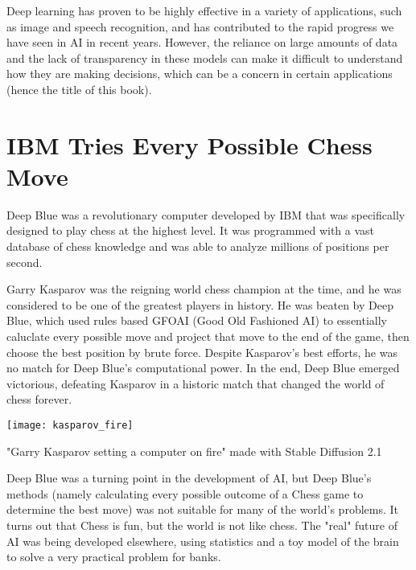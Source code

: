 Deep learning has proven to be highly effective in a variety of applications, such as image and speech recognition, and has contributed to the rapid progress we have seen in AI in recent years. However, the reliance on large amounts of data and the lack of transparency in these models can make it difficult to understand how they are making decisions, which can be a concern in certain applications (hence the title of this book).

\section{IBM Tries Every Possible Chess Move}

Deep Blue was a revolutionary computer developed by IBM that was specifically designed to play chess at the highest level. It was programmed with a vast database of chess knowledge and was able to analyze millions of positions per second.

Garry Kasparov was the reigning world chess champion at the time, and he was considered to be one of the greatest players in history. He was beaten by Deep Blue, which used rules based GFOAI (Good Old Fashioned AI) to essentially caluclate every possible move and project that move to the end of the game, then choose the best position by brute force. Despite Kasparov's best efforts, he was no match for Deep Blue's computational power. In the end, Deep Blue emerged victorious, defeating Kasparov in a historic match that changed the world of chess forever.

\begin{marginfigure}[-5.5cm]
        \texttt{[image: kasparov\_fire]}
	\caption{"Garry Kasparov setting a computer on fire" made with Stable Diffusion 2.1}
\end{marginfigure}

Deep Blue was a turning point in the development of AI, but Deep Blue's methods (namely calculating every possible outcome of a Chess game to determine the best move) was not suitable for many of the world's problems. It turns out that Chess is fun, but the world is not like chess. The "real" future of AI was being developed elsewhere, using statistics and a toy model of the brain to solve a very practical problem for banks.

